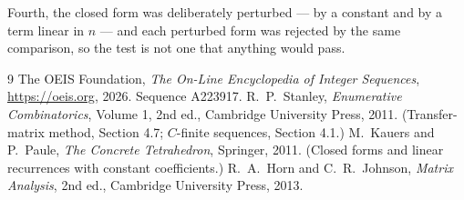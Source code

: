 \documentclass[11pt,a4paper]{article}
\theoremstyle{plain}
\theoremstyle{definition}
\begin{document}
Fourth, the closed form was deliberately perturbed --- by a constant and by a term linear in
$n$ --- and each perturbed form was rejected by the same comparison, so the test is not one
that anything would pass.

\begin{thebibliography}{9}
 The OEIS Foundation, \emph{The On-Line Encyclopedia of Integer
Sequences}, \url{https://oeis.org}, 2026. Sequence A223917.
 R.~P.~Stanley, \emph{Enumerative Combinatorics}, Volume 1, 2nd ed.,
Cambridge University Press, 2011. (Transfer-matrix method, Section 4.7; $C$-finite sequences,
Section 4.1.)
 M.~Kauers and P.~Paule, \emph{The Concrete Tetrahedron}, Springer, 2011.
(Closed forms and linear recurrences with constant coefficients.)
 R.~A.~Horn and C.~R.~Johnson, \emph{Matrix Analysis}, 2nd ed., Cambridge
University Press, 2013.
\end{thebibliography}
\end{document}
